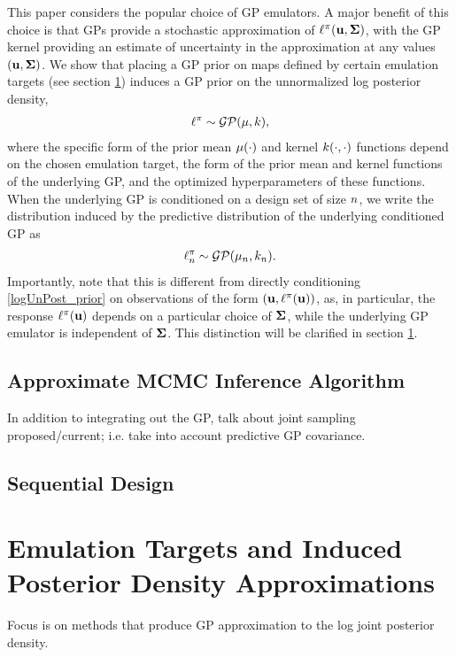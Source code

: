 \documentclass[12pt]{article}
\begin{document}
This paper considers the popular choice of GP emulators. A major benefit of this choice is that GPs provide a stochastic approximation of 
$\ell^{\pi}(\mathbf{u}, \boldsymbol{\Sigma})$, with the GP kernel providing an estimate of uncertainty in the approximation at any values $(\mathbf{u}, \boldsymbol{\Sigma})$. 
We show that placing a GP prior on maps defined by certain emulation targets 
(see section \ref{emulation_targets}) induces a GP prior on the unnormalized log posterior density, 
\begin{align}
\ell^{\pi} \sim \mathcal{GP}(\mu, k), \label{logUnPost_prior}
\end{align}
where the specific form of the prior mean $\mu(\cdot)$ and kernel $k(\cdot, \cdot)$ functions depend on the chosen emulation target, 
the form of the prior mean and kernel functions of the underlying GP, and the optimized hyperparameters of these functions. 
When the underlying GP is conditioned on a design set of size $n$, we write the distribution induced by the predictive distribution 
of the underlying conditioned GP as 
\begin{align}
\ell^{\pi}_{n} \sim \mathcal{GP}({\mu}_{n}, {k}_{n}).
\end{align}
Importantly, note that this is different from directly conditioning \ref{logUnPost_prior} on observations of the form $(\mathbf{u}, \ell^{\pi}(\mathbf{u}))$, as, 
in particular, the response $\ell^{\pi}(\mathbf{u})$ depends on a particular choice of $\boldsymbol{\Sigma}$, while the underlying GP emulator is independent of 
$\boldsymbol{\Sigma}$. This distinction will be clarified in section \ref{emulation_targets}. 

\subsection{Approximate MCMC Inference Algorithm}
In addition to integrating out the GP, talk about joint sampling proposed/current; i.e. take into account predictive GP covariance. 

\subsection{Sequential Design}

\section{Emulation Targets and Induced Posterior Density Approximations} \label{emulation_targets}
Focus is on methods that produce GP approximation to the log joint posterior density. 
\end{document}
